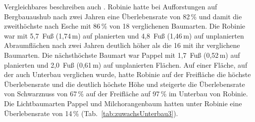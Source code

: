 \documentclass[twocolumn]{scrartcl}
\begin{document}
\begin{table}[htbp]
  \centering
  \label{tab:zuwachsUnterbau2}
\end{table}

Vergleichbares beschreiben auch
\citet{limstrom1951schuttaufforstung}. Robinie hatte bei Aufforstungen
auf Bergbauaushub nach zwei Jahren eine Überlebensrate von 82\,\% und
damit die zweithöchste nach Esche mit 86\,\% von 18 verglichenen
Baumarten. Die Robinie war mit 5,7~Fuß (1,74\,m) auf planierten und
4,8~Fuß (1,46\,m) auf unplanierten Abraumflächen nach zwei Jahren
deutlich höher als die 16 mit ihr verglichene Baumarten. Die
nächsthöchste Baumart war Pappel mit 1,7~Fuß (0,52\,m) auf planierten
und 2,0~Fuß (0,61\,m) auf unplanierten Flächen. Auf einer Fläche, auf
der auch Unterbau verglichen wurde, hatte Robinie auf der Freifläche
die höchste Überlebensrate und die deutlich höchste Höhe und steigerte
die Überlebensrate von Schwarznuss von 67\,\% auf der Freifläche auf
97\,\% im Unterbau von Robinie. Die Lichtbaumarten Pappel und
Milchorangenbaum hatten unter Robinie eine Überlebensrate von 14\,\%
(Tab.~\ref{tab:zuwachsUnterbau3}).
\end{document}
